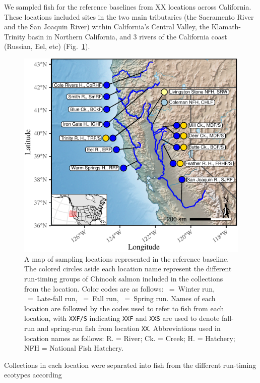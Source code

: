 We sampled fish for the reference baselines from XX locations across California.
These locations included sites in the two
main tributaries (the Sacramento River and the San Joaquin River) within
California's Central Valley, the Klamath-Trinity basin in Northern California, and
3 rivers of the California coast (Russian, Eel, etc)
(Fig.~\ref{fig:map}).
\begin{figure}
\newcommand{\mapcap}{\footnotesize  A map of sampling locations represented in the reference 
baseline.  The colored circles aside
each location name represent the different run-timing groups of Chinook salmon
included in the collections from the location.  Color codes are as follows: \Wball~=~Winter run,
\LFball{}~=~Late-fall run, \Fball~=~Fall run, \Sball~=~Spring run. 
Names of each location are followed by the codes used to refer to fish from each location, with
{\tt XXF/S} indicating {\tt XXF} and {\tt XXS} are used to denote fall-run and spring-run fish
from location {\tt XX}.  Abbreviations used in location names as follows: R. = River; Ck. = Creek; H. = Hatchery; NFH = National Fish Hatchery.}
\begin{center}
\includegraphics[width=\columnwidth]{images/map-crop.pdf}
\end{center}
\caption[\mapcap]{\mapcap}
\label{fig:map}
\end{figure}
Collections in each location were separated into fish from the different run-timing ecotypes according
